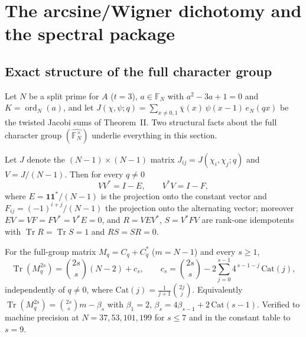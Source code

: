 
\section{The arcsine/Wigner dichotomy and the spectral package}
\label{sec:r91}

\subsection{Exact structure of the full character group}

Let $N$ be a split prime for $A$ ($t=3$), $a \in \mathbb{F}_N$ with
$a^2 - 3a + 1 = 0$ and $K = \operatorname{ord}_N(a)$, and let
$J(\chi,\psi;q) = \sum_{x \neq 0,1} \overline{\chi}(x)\,\psi(x-1)\,e_N(qx)$
be the twisted Jacobi sums of Theorem~II.  Two structural facts about the
full character group $(\widehat{\mathbb{F}_N^\times})$ underlie everything
in this section.

\begin{lemma}
\label{lem:partialisometry}
Let $J$ denote the $(N{-}1)\times(N{-}1)$ matrix $J_{ij} = J(\chi_i,\chi_j;q)$
and $V = J/(N{-}1)$.  Then for every $q \neq 0$
\[
  V V^{*} = I - E, \qquad V^{*} V = I - F,
\]
where $E = \mathbf{1}\mathbf{1}^{*}/(N{-}1)$ is the projection onto the
constant vector and $F_{ij} = (-1)^{i+j}/(N{-}1)$ the projection onto the
alternating vector; moreover $EV = VF = FV^{*} = V^{*}E = 0$, and
$R = VEV^{*}$, $S = V^{*}FV$ are rank-one idempotents with
$\operatorname{Tr} R = \operatorname{Tr} S = 1$ and $RS = SR = 0$.
\end{lemma}

\begin{theorem}
\label{thm:fullgroupmoments}
For the full-group matrix $M_q = C_q + C_q^{*}$ ($m = N{-}1$) and every
$s \ge 1$,
\[
  \operatorname{Tr}(M_q^{2s}) = \binom{2s}{s}(N{-}2) + c_s,
  \qquad
  c_s = \binom{2s}{s} - 2\sum_{j=0}^{s-1} 4^{\,s-1-j}\,\mathrm{Cat}(j),
\]
independently of $q \neq 0$, where $\mathrm{Cat}(j) = \frac{1}{j+1}\binom{2j}{j}$.
Equivalently $\operatorname{Tr}(M_q^{2s}) = \binom{2s}{s} m - \beta_s$ with
$\beta_1 = 2$, $\beta_s = 4\beta_{s-1} + 2\,\mathrm{Cat}(s-1)$.
Verified to machine precision at $N = 37, 53, 101, 199$ for $s \le 7$ and
in the constant table to $s = 9$.
\end{theorem}

